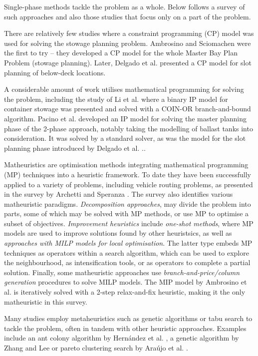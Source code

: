 \documentclass[preprint,12pt,3p]{elsarticle}
\begin{document}
Single-phase methods tackle the problem as a whole. Below follows a survey of such approaches and also those studies that focus only on a part of the problem.

There are relatively few studies where a constraint programming (CP) model was used for solving the stowage planning problem. Ambrosino and Sciomachen \cite{AS98} were the first to try -- they developed a CP model for the whole Master Bay Plan Problem (stowage planning). Later, Delgado et al. \cite{DJJRA12} presented a CP model for slot planning of below-deck locations.

A considerable amount of work utilises mathematical programming for solving the problem, including the study of Li et al. \cite{LTCD08} where a binary IP model for container stowage was presented and solved with a COIN-OR branch-and-bound algorithm. Pacino et al. \cite{PDJB12} developed an IP model for solving the master planning phase of the 2-phase approach, notably taking the modelling of ballast tanks into consideration. It was solved by a standard solver, as was the model for the slot planning phase introduced by Delgado et al. \cite{DJJRA12}.. 

Matheuristics are optimisation methods integrating mathematical programming (MP) techniques into a heuristic framework. To date they have been successfully applied to a variety of problems, including vehicle routing problems, as presented in the survey by Archetti and Speranza \cite{AS14}. The survey also identifies various matheuristic paradigms. \textit{Decomposition approaches}, may divide the problem into parts, some of which may be solved with MP methods, or use MP to optimise a subset of objectives. \textit{Improvement heuristics} include \textit{one-shot methods}, where MP models are used to improve solutions found by other heuristsics, as well as \textit{approaches with MILP models for local optimisation}. The latter type embeds MP techniques as operators within a search algorithm, which can be used to explore the neighbourhood, as intensification tools, or as operators to complete a partial solution. Finally, some matheuristic approaches use \textit{branch-and-price/column generation} procedures to solve MILP models. The MIP model by Ambrosino et al. \cite{APS15} is iteratively solved with a 2-step relax-and-fix heuristic, making it the only matheuristic in this survey.

Many studies employ metaheuristics such as genetic algorithms or tabu search to tackle the problem, often in tandem with other heuristic approaches. Examples include an ant colony algorithm by Hern\'{a}ndez et al. \cite{H13}, a genetic algorithm by Zhang and Lee \cite{ZL15} or pareto clustering search by Ara\'{u}jo et al. \cite{AACS16}.
\end{document}
